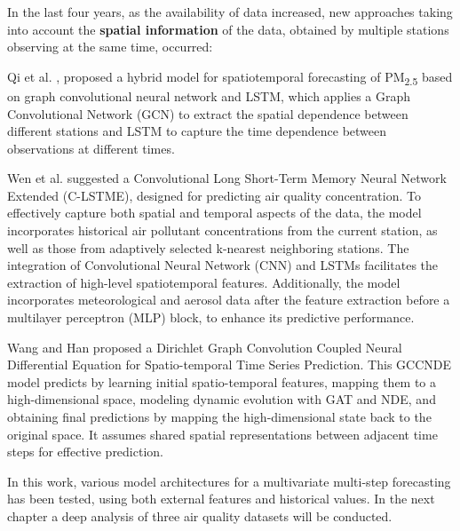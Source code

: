 In the last four years, as the availability of data increased, new approaches taking into account the \textbf{spatial information} of the data, obtained by multiple stations observing at the same time, occurred:

\noindent Qi et al. \cite{graphlstm1}, proposed a hybrid model for spatiotemporal forecasting of PM\textsubscript{2.5} based on graph convolutional neural network and LSTM, which applies a Graph Convolutional Network (GCN) to extract the spatial dependence between different stations and LSTM to capture the time dependence between observations at different times. 

\noindent Wen et al. \cite{WEN20191091} suggested a Convolutional Long Short-Term Memory Neural Network Extended (C-LSTME), designed for predicting air quality concentration. To effectively capture both spatial and temporal aspects of the data, the model incorporates historical air pollutant concentrations from the current station, as well as those from adaptively selected k-nearest neighboring stations. The integration of Convolutional Neural Network (CNN) and LSTMs facilitates the extraction of high-level spatiotemporal features. Additionally, the model incorporates meteorological and aerosol data after the feature extraction before a multilayer perceptron (MLP) block, to enhance its predictive performance.

\noindent Wang and Han \cite{Wang2023} proposed a Dirichlet Graph Convolution Coupled Neural Differential Equation for Spatio-temporal Time Series Prediction. This GCCNDE model predicts by learning initial spatio-temporal features, mapping them to a high-dimensional space, modeling dynamic evolution with GAT and NDE, and obtaining final predictions by mapping the high-dimensional state back to the original space. It assumes shared spatial representations between adjacent time steps for effective prediction.

In this work, various model architectures for a multivariate multi-step forecasting has been tested, using both external features and historical values. In the next chapter a deep analysis of three air quality datasets will be conducted.
\newpage



















